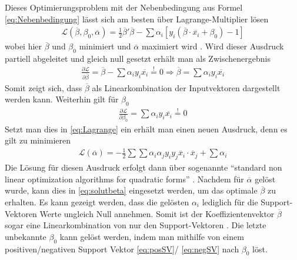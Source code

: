 \documentclass[
]{article}
\begin{document}
Dieses Optimierungsproblem mit der Nebenbedingung aus Formel
\eqref{eq:Nebenbedingung} lässt sich am besten über Lagrange-Multiplier
lösen \begin{align}
\mathcal{L}(\overline\beta,\beta_0,\overline \alpha)=\frac{1}{2}\overline \beta ' \overline \beta-\sum \alpha_i[y_i(\overline \beta \cdot \overline{x_i}+\beta_0)-1]\label{eq:Lagrange}
\end{align} wobei hier \(\overline{\beta}\) und \(\beta_0\) minimiert
und \(\overline{\alpha}\) maximiert wird
\parencite{vapnikEstimationDependencesBased2006}. Wird dieser Ausdruck
partiell abgeleitet und gleich null gesetzt erhält man als
Zwischenergebnis \begin{align}
\frac{\partial \mathcal{L}}{\partial \overline{\beta}}=\overline{\beta}-\sum \alpha_i y_i \overline{x_i}\overset{!}{=}0 \Rightarrow \overline{\beta}=\sum \alpha_i y_i \overline{x_i}\label{eq:solutbeta}
\end{align} Somit zeigt sich, dass \(\overline{\beta}\) als
Linearkombination der Inputvektoren dargestellt werden kann. Weiterhin
gilt für \(\beta_0\) \begin{align}
\frac{\partial \mathcal{L}}{\partial \beta_0}=\sum \alpha_i y_i \overline{x_i}\overset{!}{=}0\label{eq:solutbeta0}
\end{align} Setzt man dies in \eqref{eq:Lagrange} ein erhält man einen
neuen Ausdruck, denn es gilt zu minimieren \begin{align}
\mathcal{L}(\overline \alpha)=-\frac{1}{2}\sum \sum \alpha_i \alpha_j y_i y_j \overline{x}_i \cdot \overline{x}_j+\sum \alpha_i\label{eq:dualproblem}
\end{align} Die Lösung für diesen Ausdruck erfolgt dann über sogenannte
\enquote{standard non linear optimization algorithms for quadratic forms}
\parencite{boserTrainingAlgorithmOptimal1992}. Nachdem für
\(\overline \alpha\) gelöst wurde, kann dies in \eqref{eq:solutbeta}
eingesetzt werden, um das optimale \(\overline{\beta}\) zu erhalten. Es
kann gezeigt werden, dass die gelösten \(\alpha_i\) lediglich für die
Support-Vektoren Werte ungleich Null annehmen. Somit ist der
Koeffizientenvektor \(\overline{\beta}\) sogar eine Linearkombination
von nur den Support-Vektoren
\parencite{boserTrainingAlgorithmOptimal1992}. Die letzte unbekannte
\(\beta_0\) kann gelöst werden, indem man mithilfe von einem
positiven/negativen Support Vektor \eqref{eq:posSV}/ \eqref{eq:negSV}
nach \(\beta_0\) löst.
\end{document}
